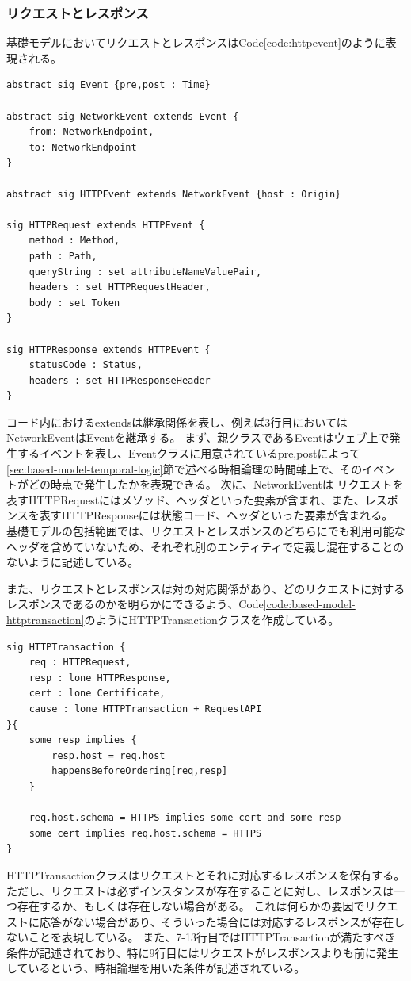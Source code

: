 \documentclass[12pt,a4paper]{jbook}
\begin{document}
\subsubsection{リクエストとレスポンス}
基礎モデルにおいてリクエストとレスポンスはCode\ref{code:httpevent}のように表現される。
\begin{lstlisting}[caption=リクエストとレスポンスを表現するクラス, label=code:httpevent]
abstract sig Event {pre,post : Time}

abstract sig NetworkEvent extends Event {
	from: NetworkEndpoint,
	to: NetworkEndpoint
}

abstract sig HTTPEvent extends NetworkEvent {host : Origin}

sig HTTPRequest extends HTTPEvent { 
	method : Method,
	path : Path,
	queryString : set attributeNameValuePair,
	headers : set HTTPRequestHeader,
	body : set Token
}

sig HTTPResponse extends HTTPEvent {
	statusCode : Status,
	headers : set HTTPResponseHeader
}
\end{lstlisting}
コード内におけるextendsは継承関係を表し、例えば3行目においてはNetworkEventはEventを継承する。
まず、親クラスであるEventはウェブ上で発生するイベントを表し、Eventクラスに用意されているpre,postによって\ref{sec:based-model-temporal-logic}節で述べる時相論理の時間軸上で、そのイベントがどの時点で発生したかを表現できる。
次に、NetworkEventは
リクエストを表すHTTPRequestにはメソッド、ヘッダといった要素が含まれ、また、レスポンスを表すHTTPResponseには状態コード、ヘッダといった要素が含まれる。
基礎モデルの包括範囲では、リクエストとレスポンスのどちらにでも利用可能なヘッダを含めていないため、それぞれ別のエンティティで定義し混在することのないように記述している。

また、リクエストとレスポンスは対の対応関係があり、どのリクエストに対するレスポンスであるのかを明らかにできるよう、Code\ref{code:based-model-httptransaction}のようにHTTPTransactionクラスを作成している。
\begin{lstlisting}[caption=リクエストとレスポンスの対応関係, label=code:based-model-httptransaction]
sig HTTPTransaction {
	req : HTTPRequest,
	resp : lone HTTPResponse,
	cert : lone Certificate,
	cause : lone HTTPTransaction + RequestAPI
}{
	some resp implies {
		resp.host = req.host
		happensBeforeOrdering[req,resp]
	}

	req.host.schema = HTTPS implies some cert and some resp
	some cert implies req.host.schema = HTTPS
}
\end{lstlisting}
HTTPTransactionクラスはリクエストとそれに対応するレスポンスを保有する。
ただし、リクエストは必ずインスタンスが存在することに対し、レスポンスは一つ存在するか、もしくは存在しない場合がある。
これは何らかの要因でリクエストに応答がない場合があり、そういった場合には対応するレスポンスが存在しないことを表現している。
また、7-13行目ではHTTPTransactionが満たすべき条件が記述されており、特に9行目にはリクエストがレスポンスよりも前に発生しているという、時相論理を用いた条件が記述されている。
\end{document}
